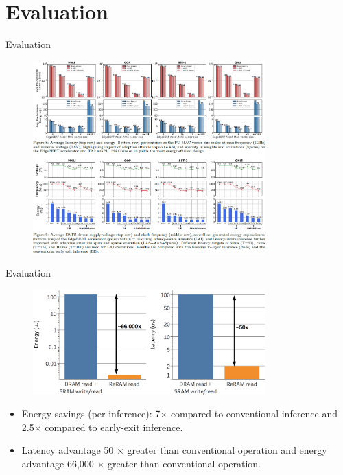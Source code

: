 \documentclass[12pt]{beamer}
\begin{document}
\section{Evaluation}
\begin{frame}{Evaluation}
    \begin{figure}[H]
        \centering
        \includegraphics[width=0.8\textwidth]{2.png}
    \end{figure}
\end{frame}
\begin{frame}{Evaluation}
    \begin{figure}[H]
        \centering
        \includegraphics[width=0.8\textwidth]{3.png}
    \end{figure}
    \begin{itemize}
        \item Energy savings (per-inference): 7$\times$ compared to conventional inference and 2.5$\times$ compared to early-exit inference.
        \item Latency advantage 50 $\times$ greater than conventional operation and energy advantage 66,000 $\times$ greater than conventional operation.
    \end{itemize}
\end{frame}
\end{document}
